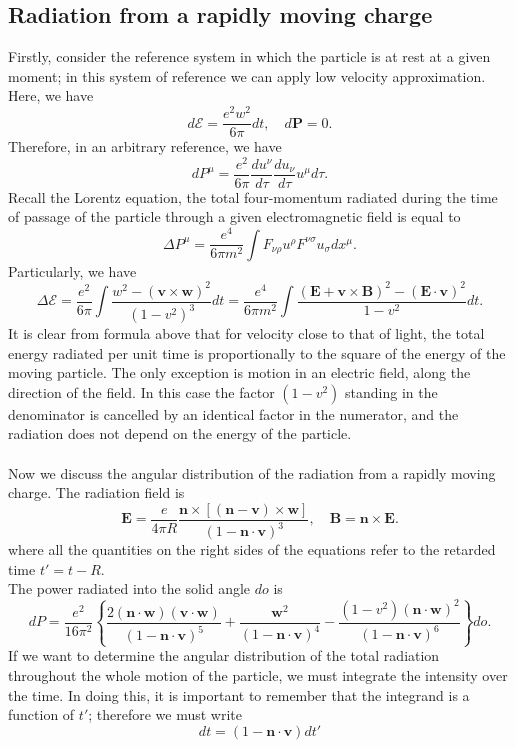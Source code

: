 \subsection{Radiation from a rapidly moving charge}
Firstly, consider the reference system in which the particle is at rest at a given moment; in this system of reference we can apply low velocity approximation. Here, we have
\[d\mathcal{E} = \frac{e^2 w^2}{6\pi}dt , \quad d\bm{P} = 0.\]
Therefore, in an arbitrary reference, we have
\[dP^{\mu} = \frac{e^2}{6\pi} \frac{du^{\nu}}{d\tau} \frac{du_{\nu}}{d\tau} u^{\mu}d\tau.\]
Recall the Lorentz equation, the total four-momentum radiated during the time of passage of the particle through a given electromagnetic field is equal to
\[\Delta P^{\mu} = \frac{e^4}{6\pi m^2} \int F_{\nu\rho}u^{\rho} F^{\nu\sigma}u_{\sigma} dx^{\mu}.\]
Particularly, we have
\[\Delta \mathcal{E} = \frac{e^2}{6\pi} \int \frac{w^2 - (\bm{v} \times \bm{w})^2}{(1-v^2)^3} dt = \frac{e^4}{6\pi m^2} \int \frac{(\bm{E} + \bm{v} \times \bm{B})^2-(\bm{E} \cdot \bm{v})^2}{1-v^2} dt.\]
It is clear from formula above that for velocity close to that of light, the total energy radiated per unit time is proportionally to the square of the energy of the moving particle. The only exception is motion in an electric field, along the direction of the field. In this case the factor $(1-v^2)$ standing in the denominator is cancelled by an identical factor in the numerator, and the radiation does not depend on the energy of the particle.
\\ \\
Now we discuss the angular distribution of the radiation from a rapidly moving charge. The radiation field is
\[\bm{E} = \frac{e}{4\pi R} \frac{\bm{n} \times \left[(\bm{n} - \bm{v}) \times \bm{w} \right]}{(1 - \bm{n} \cdot \bm{v})^3}  , \quad \bm{B} = \bm{n} \times \bm{E}.\]
where all the quantities on the right sides of the equations refer to the retarded time $t' = t - R$. \\
The power radiated into the solid angle $do$ is
\[dP = \frac{e^2}{16\pi^2} \left\{ \frac{2(\bm{n}\cdot\bm{w})(\bm{v}\cdot\bm{w})}{(1-\bm{n}\cdot\bm{v})^5} + \frac{\bm{w}^2}{(1-\bm{n}\cdot\bm{v})^4} - \frac{(1-v^2)(\bm{n}\cdot\bm{w})^2}{(1-\bm{n}\cdot\bm{v})^6}\right\}do.\]
If we want to determine the angular distribution of the total radiation throughout the whole motion of the particle, we must integrate the intensity over the time. In doing this, it
is important to remember that the integrand is a function of $t'$; therefore we must write
\[dt = (1-\bm{n}\cdot\bm{v})dt'\]
